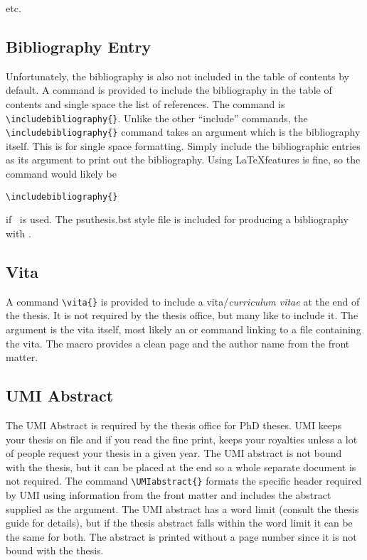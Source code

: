 \documentclass[11pt]{article}
\begin{document}
\begin{singlespace}
\noindent etc.

\subsection*{Bibliography Entry} Unfortunately, the bibliography is also not
included in the table of contents by default.  A command is provided to include
the bibliography in the table of contents and single space the list of
references.  The command is \verb+\includebibliography{}+.  Unlike the other
``include'' commands, the \verb+\includebibliography{}+ command takes an
argument which is the bibliography itself.  This is for single space
formatting.  Simply include the bibliographic entries as its argument to print
out the bibliography.  Using \LaTeX features is fine, so the command would
likely be

\noindent \verb+\includebibliography{}+

\noindent if \BibTeX\ is used. The psuthesis.bst style file is included for
producing a bibliography with \BibTeX.

\subsection*{Vita}

A command \verb+\vita{}+ is provided to include a vita/\emph{curriculum vitae}
at the end of the thesis.  It is not required by the thesis office, but many
like to include it.  The argument is the vita itself, most likely an
\verb++ or \verb++ command linking to a file containing the
vita.  The macro provides a clean page and the author name from the front
matter.

\subsection*{UMI Abstract}  

The UMI Abstract is required by the thesis office for PhD theses.  UMI keeps
your thesis on file and if you read the fine print, keeps your royalties unless
a lot of people request your thesis in a given year.  The UMI abstract is not
bound with the thesis, but it can be placed at the end so a whole separate
document is not required.  The command \verb+\UMIabstract{}+ formats the
specific header required by UMI using information from the front matter and
includes the abstract supplied as the argument.  The UMI abstract has a word
limit (consult the thesis guide for details), but if the thesis abstract falls
within the word limit it can be the same for both.  The abstract is printed
without a page number since it is not bound with the thesis.


\end{singlespace}
\end{document}

